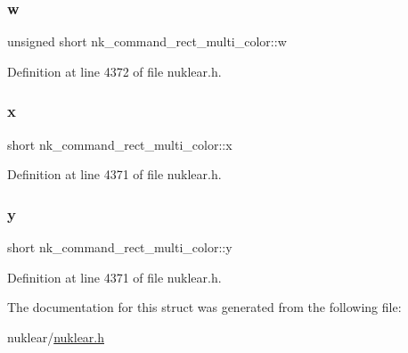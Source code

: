 \subsubsection{\texorpdfstring{w}{w}}
{\footnotesize\ttfamily unsigned short nk\+\_\+command\+\_\+rect\+\_\+multi\+\_\+color\+::w}



Definition at line 4372 of file nuklear.\+h.

\mbox{\label{structnk__command__rect__multi__color_ae0ac34d18501f6fd6acd335ccb1a83df}} 
\subsubsection{\texorpdfstring{x}{x}}
{\footnotesize\ttfamily short nk\+\_\+command\+\_\+rect\+\_\+multi\+\_\+color\+::x}



Definition at line 4371 of file nuklear.\+h.

\mbox{\label{structnk__command__rect__multi__color_aa1d244d6076653c43109ab1e45c197e3}} 
\subsubsection{\texorpdfstring{y}{y}}
{\footnotesize\ttfamily short nk\+\_\+command\+\_\+rect\+\_\+multi\+\_\+color\+::y}



Definition at line 4371 of file nuklear.\+h.



The documentation for this struct was generated from the following file\+:\begin{DoxyCompactItemize}
\item 
nuklear/\mbox{\hyperlink{nuklear_8h}{nuklear.\+h}}\end{DoxyCompactItemize}

